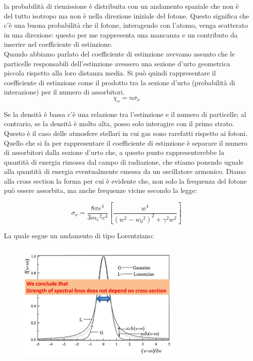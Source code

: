 \documentclass[a4paper,11pt]{article}
\begin{document}
    la probabilità di riemissione è distribuita con un andamento spaziale che non è del tutto isotropo ma non è nella direzione iniziale del fotone. Questo significa che c'è una buona probabilità che il fotone, interagendo con l'atomo, venga scatterato in una direzione: questo per me rappresenta una mancanza e un contributo da inserire nel coefficiente di estinzione.\\
    Quando abbiamo parlato del coefficiente di estinzione avevamo assunto che le particelle responsabili dell'estinzione avessero una sezione d'urto geometrica piccola rispetto alla loro distanza media. Si può quindi rappresentare il coefficiente di estinzione come il prodotto tra la sezione d'urto (probabilità di interazione) per il numero di assorbitori.
    $$
        \chi_{\nu} = n\sigma_{\nu}
    $$
    
    Se la densità è bassa c'è una relazione tra l'estinzione e il numero di particelle; al contrario, se la densità è molto alta, posso solo interagire con il primo strato. Questo è il caso delle atmosfere stellari in cui gas sono rarefatti rispetto ai fotoni. Quello che si fa per rappresentare il coefficiente di estinzione è separare il numero di assorbitori dalla sezione d'urto che, a questo punto rappresenterebbe la quantità di energia rimossa dal campo di radiazione, che stiamo ponendo uguale alla quantità di energia eventualmente emessa da un oscillatore armonico. Diamo alla cross section la forma per cui è evidente che, non solo la frequenza del fotone può essere assorbita, ma anche frequenze vicine secondo la legge:

    $$
        \sigma_{\nu} = \frac{8{\pi}e^4}{3{m_e}^2c^4}[\frac{w^4}{(w^2-{w_0}^2)^2+{\gamma}^2{w^2}}]  
    $$

    La quale segue un andamento di tipo Lorentziano:
    
    
      \begin{figure}[h!!]
        \centering
        \includegraphics[width=8cm]{cross_section.jpg}
        \caption{}
        \label{fig:cross section }
      \end{figure}
    
\end{document}
